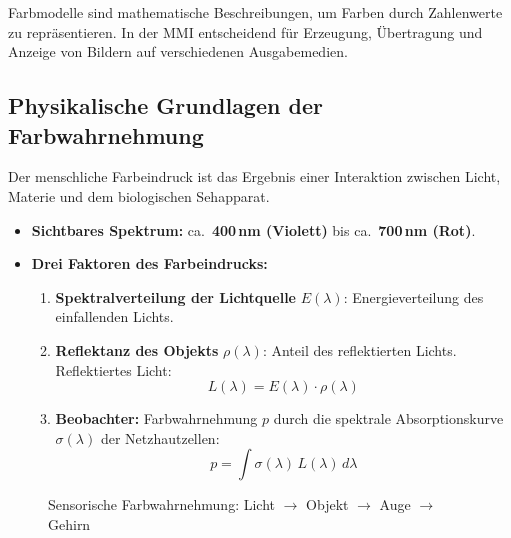 \documentclass[12pt, a4paper]{article}
\begin{document}
Farbmodelle sind mathematische Beschreibungen, um Farben durch Zahlenwerte zu
repräsentieren. In der MMI entscheidend für Erzeugung, Übertragung und Anzeige
von Bildern auf verschiedenen Ausgabemedien.

\subsection{Physikalische Grundlagen der Farbwahrnehmung}

Der menschliche Farbeindruck ist das Ergebnis einer Interaktion zwischen Licht,
Materie und dem biologischen Sehapparat.

\begin{itemize}
  \item \textbf{Sichtbares Spektrum:} ca.\ \textbf{400\,nm (Violett)} bis
        ca.\ \textbf{700\,nm (Rot)}.
  \item \textbf{Drei Faktoren des Farbeindrucks:}
    \begin{enumerate}
      \item \textbf{Spektralverteilung der Lichtquelle} $E(\lambda)$: Energieverteilung
            des einfallenden Lichts.
      \item \textbf{Reflektanz des Objekts} $\rho(\lambda)$: Anteil des reflektierten
            Lichts. Reflektiertes Licht:
            \[ L(\lambda) = E(\lambda) \cdot \rho(\lambda) \]
      \item \textbf{Beobachter:} Farbwahrnehmung $p$ durch die spektrale
            Absorptionskurve $\sigma(\lambda)$ der Netzhautzellen:
            \[ p = \int \sigma(\lambda)\, L(\lambda)\, d\lambda \]
    \end{enumerate}
\end{itemize}

\begin{figure}[H]
\centering
{}
\caption{Sensorische Farbwahrnehmung: Licht $\rightarrow$ Objekt $\rightarrow$ Auge $\rightarrow$ Gehirn}
\end{figure}
\end{document}
